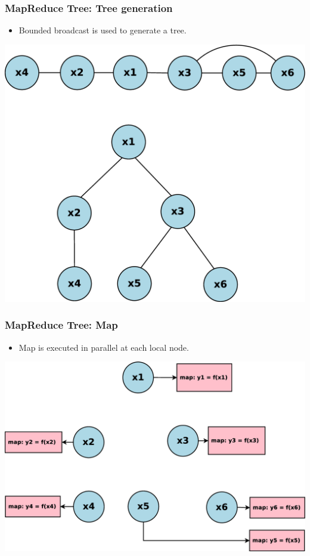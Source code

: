 \documentclass[red]{beamer}
\begin{document}
\begin{frame}
\frametitle{MapReduce Tree: Tree generation}
\begin{itemize}
\item Bounded broadcast is used to generate a tree.
\end{itemize}
\begin{center}
\includegraphics[scale=0.15]{figs/mapreduce_tree_tree}
\end{center}
\end{frame}

\begin{frame}
\frametitle{MapReduce Tree: Map}
\begin{itemize}
\item Map is executed in parallel at each local node.
\end{itemize}
\begin{center}
\includegraphics[scale=0.2]{figs/mapreduce_tree_map}
\end{center}
\end{frame}
\end{document}
